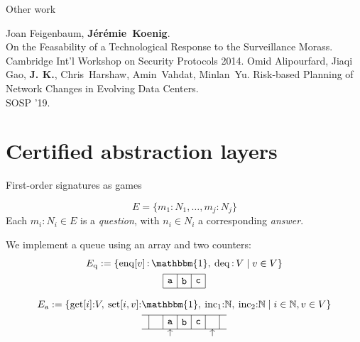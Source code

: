 \documentclass[aspectratio=141]{beamer}
\newcommand{\kw}[1]{\ensuremath{ \mathrm{#1} }}
\newcommand{\fme}{\textbf{J\'er\'emie~Koenig}}
\newcommand{\me}{\textbf{J. K.}}
\begin{document}
\begin{frame}{Other work} %
  \begin{thebibliography}{10}
      Joan Feigenbaum, \fme.
      \newblock \\
      On the Feasability of
      a Technological Response to the Surveillance Morass.
      \newblock \\
      Cambridge Int'l Workshop on Security Protocols 2014.
      Omid Alipourfard, Jiaqi Gao, \me,
      Chris~Harshaw, Amin~Vahdat, Minlan~Yu.
      \newblock
      Risk-based Planning of Network Changes in Evolving Data Centers.
      \newblock \\
      SOSP '19.
  \end{thebibliography}
\end{frame}


\section{Certified abstraction layers} %

\begin{frame}{First-order signatures as games} %
  \begin{definition}[Signature]
  \[
    E = \{ m_1 \mathop{:} N_1, \ldots, m_j \mathop{:} N_j \}
  \]
  Each $m_i \mathop{:} N_i \in E$ is a \emph{question},
  with $n_i \in N_i$ a corresponding \emph{answer}.
  \end{definition}
  \pause
  \begin{example}
    We implement a queue using an array and two counters:
    \begin{gather*}
      E_\kw{q} := \{
        \kw{enq}[v] \mathop{:} \mathbbm{1}, \:
        \kw{deq} \mathop{:} V \mid
        v \in V \}
      \\
      \begin{tikzpicture}[scale=0.5]
        \draw (0,0) grid (3,1);
        \node at (0.5,0.5) {$\mathtt{a}$};
        \node at (1.5,0.5) {$\mathtt{b}$};
        \node at (2.5,0.5) {$\mathtt{c}$};
      \end{tikzpicture}
      \\[1ex]
      E_\kw{a} := \{
        \kw{get}[i] {:} V, \:
        \kw{set}[i,v] {:} \mathbbm{1}, \:
        \kw{inc}_1 {:} \mathbb{N}, \:
        \kw{inc}_2 {:} \mathbb{N}
        \mid i \in \mathbb{N}, v \in V \} \\
      \begin{tikzpicture}[scale=0.5]
        \draw (-0.5,0) grid (5.5,1);
        \node at (1.5,0.5) {$\mathtt{a}$};
        \node at (2.5,0.5) {$\mathtt{b}$};
        \node at (3.5,0.5) {$\mathtt{c}$};
        \draw[->] (1.5,-0.5) -- (1.5,0);
        \draw[->] (4.5,-0.5) -- (4.5,0);
      \end{tikzpicture}
    \end{gather*}
  \end{example}
\end{frame}
\end{document}
